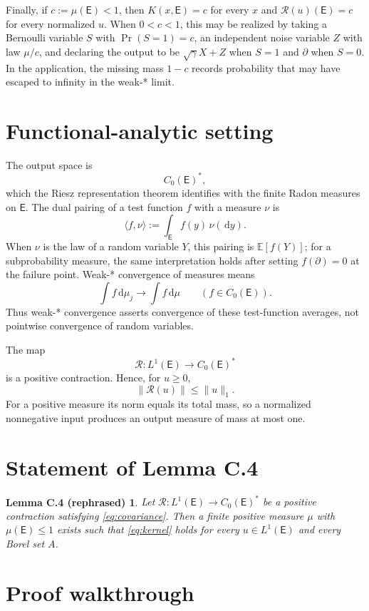 \documentclass[11pt]{article}
\newcommand{\dd}{\,\mathrm d}
\newtheorem*{lemmaC}{Lemma C.4 (rephrased)}
\begin{document}
Finally, if $c:=\mu(\mathsf E)<1$, then $K(x,\mathsf E)=c$ for every $x$ and
$\mathcal R(u)(\mathsf E)=c$ for every normalized $u$.  When $0<c<1$, this may be
realized by taking a Bernoulli variable $S$ with $\Pr(S=1)=c$, an independent
noise variable $Z$ with law $\mu/c$, and declaring the output to be
$\sqrt\gamma X+Z$ when $S=1$ and $\partial$ when $S=0$.  In the application,
the missing mass $1-c$ records probability that may have escaped to
infinity in the weak-* limit.

\section{Functional-analytic setting}

The output space is
\[
  C_0(\mathsf E)^*,
\]
which the Riesz representation theorem identifies with the finite Radon
measures on $\mathsf E$.  The dual pairing of a test function $f$ with a measure
$\nu$ is
\[
  \langle f,\nu\rangle:=\int_{\mathsf E}f(y)\,\nu(\dd y).
\]
When $\nu$ is the law of a random variable $Y$, this pairing is
$\mathbb E[f(Y)]$; for a subprobability measure, the same interpretation
holds after setting $f(\partial)=0$ at the failure point.  Weak-* convergence
of measures means
\[
  \int f\dd\mu_j\longrightarrow\int f\dd\mu
  \qquad(f\in C_0(\mathsf E)).
\]
Thus weak-* convergence asserts convergence of these test-function averages,
not pointwise convergence of random variables.

The map
\[
  \mathcal R:L^1(\mathsf E)\longrightarrow C_0(\mathsf E)^*
\]
is a positive contraction.  Hence, for $u\geq0$,
\[
  \|\mathcal R(u)\|\leq\|u\|_1.
\]
For a positive measure its norm equals its total mass, so a normalized
nonnegative input produces an output measure of mass at most one.

\section{Statement of Lemma C.4}

\begin{lemmaC}
Let $\mathcal R:L^1(\mathsf E)\to C_0(\mathsf E)^*$ be a positive contraction satisfying
\eqref{eq:covariance}.  Then a finite positive measure $\mu$ with
$\mu(\mathsf E)\leq1$ exists such that \eqref{eq:kernel} holds for every
$u\in L^1(\mathsf E)$ and every Borel set $A$.
\end{lemmaC}

\section{Proof walkthrough}
\end{document}
